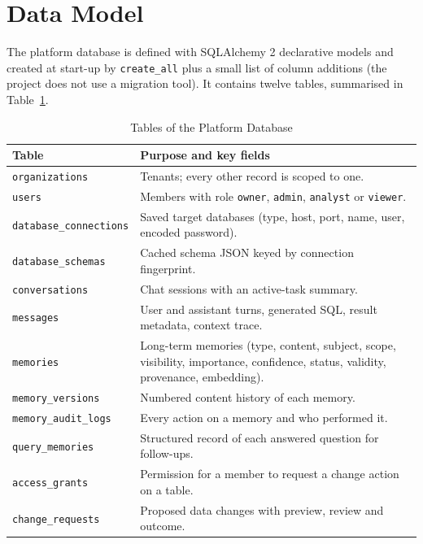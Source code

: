 \section{Data Model}
The platform database is defined with SQLAlchemy 2 declarative models and created at
start-up by \texttt{create\_all} plus a small list of column additions (the project does not
use a migration tool). It contains twelve tables, summarised in
Table~\ref{tab:platform_tables}.

\begin{table}[H]
    \centering
    \small
    \caption{Tables of the Platform Database}
    \begin{tabular}{p{4.6cm} p{10.6cm}}
        \toprule
        \textbf{Table} & \textbf{Purpose and key fields} \\
        \midrule
        \texttt{organizations}        & Tenants; every other record is scoped to one. \\[3pt]
        \texttt{users}                & Members with role \texttt{owner}, \texttt{admin}, \texttt{analyst} or \texttt{viewer}. \\[3pt]
        \texttt{database\_connections}& Saved target databases (type, host, port, name, user, encoded password). \\[3pt]
        \texttt{database\_schemas}    & Cached schema JSON keyed by connection fingerprint. \\[3pt]
        \texttt{conversations}        & Chat sessions with an active-task summary. \\[3pt]
        \texttt{messages}             & User and assistant turns, generated SQL, result metadata, context trace. \\[3pt]
        \texttt{memories}             & Long-term memories (type, content, subject, scope, visibility, importance, confidence, status, validity, provenance, embedding). \\[3pt]
        \texttt{memory\_versions}     & Numbered content history of each memory. \\[3pt]
        \texttt{memory\_audit\_logs}  & Every action on a memory and who performed it. \\[3pt]
        \texttt{query\_memories}      & Structured record of each answered question for follow-ups. \\[3pt]
        \texttt{access\_grants}       & Permission for a member to request a change action on a table. \\[3pt]
        \texttt{change\_requests}     & Proposed data changes with preview, review and outcome. \\
        \bottomrule
    \end{tabular}
    \label{tab:platform_tables}
\end{table}

